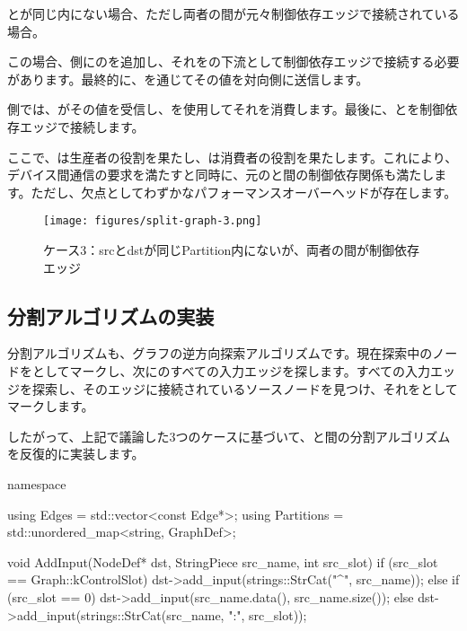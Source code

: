 \begin{content}
とが同じ内にない場合、ただし両者の間が元々制御依存エッジで接続されている場合。

この場合、側にのを追加し、それをの下流として制御依存エッジで接続する必要があります。最終的に、を通じてその値を対向側に送信します。

側では、がその値を受信し、を使用してそれを消費します。最後に、とを制御依存エッジで接続します。

ここで、は生産者の役割を果たし、は消費者の役割を果たします。これにより、デバイス間通信の要求を満たすと同時に、元のと間の制御依存関係も満たします。ただし、欠点としてわずかなパフォーマンスオーバーヘッドが存在します。

\begin{figure}[H]
\centering
\texttt{[image: figures/split-graph-3.png]}
\caption{ケース3：srcとdstが同じPartition内にないが、両者の間が制御依存エッジ}
 \label{fig:split-graph-3}
\end{figure}

\subsection{分割アルゴリズムの実装}

分割アルゴリズムも、グラフの逆方向探索アルゴリズムです。現在探索中のノードをとしてマークし、次にのすべての入力エッジを探します。すべての入力エッジを探索し、そのエッジに接続されているソースノードを見つけ、それをとしてマークします。

したがって、上記で議論した3つのケースに基づいて、と間の分割アルゴリズムを反復的に実装します。

\begin{leftbar}
\begin{c++}
namespace {
  
  using Edges = std::vector<const Edge*>;
  using Partitions = std::unordered_map<string, GraphDef>;

  void AddInput(NodeDef* dst, StringPiece src_name, int src_slot) {
    if (src_slot == Graph::kControlSlot) {
      dst->add_input(strings::StrCat("^", src_name));
    } else if (src_slot == 0) {
      dst->add_input(src_name.data(), src_name.size());
    } else {
      dst->add_input(strings::StrCat(src_name, ":", src_slot));
    }
  }

}
\end{c++}
\end{leftbar}
\end{content}
